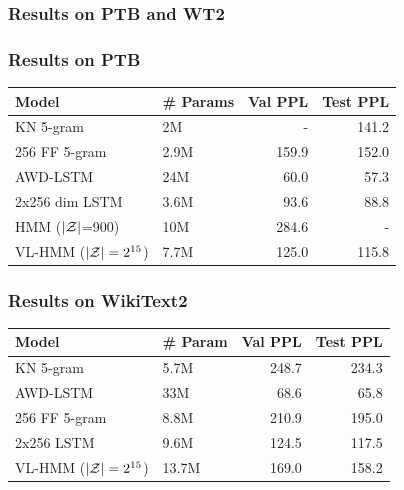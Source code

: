 \documentclass{beamer}
\begin{document}
\begin{frame}
\frametitle{Results on PTB and WT2}
\centering
{}
\end{frame}

\begin{frame}
\frametitle{Results on PTB}

\begin{table}[!t]
\centering
\begin{tabular}{llrr}
\toprule
Model & \# Params & Val PPL  & Test PPL\\
\midrule
KN 5-gram   & 2M & - & 141.2\\
256 FF 5-gram  & 2.9M     & 159.9      & 152.0  \\
AWD-LSTM  & 24M & 60.0 & 57.3\\
2x256 dim LSTM  & 3.6M     & 93.6       & 88.8   \\
HMM ($|\mathcal{Z}|$=900) & 10M & 284.6 & -\\
VL-HMM ($|\mathcal{Z}|=2^{15}$)   & 7.7M     & 125.0      & 115.8  \\
\bottomrule
\end{tabular}
\end{table}

\end{frame}

\begin{frame}
\frametitle{Results on WikiText2}

\begin{table}[!t]
\centering
\begin{tabular}{llrr}
\toprule
Model & \# Param & Val PPL & Test PPL\\
\midrule
KN 5-gram & 5.7M       & 248.7 & 234.3\\
AWD-LSTM & 33M & 68.6 & 65.8\\
256 FF 5-gram        & 8.8M    & 210.9  & 195.0\\
2x256  LSTM     & 9.6M    & 124.5  & 117.5\\
VL-HMM ($|\mathcal{Z}|=2^{15}$)           & 13.7M   & 169.0      & 158.2\\
\bottomrule
\end{tabular}
\end{table}

\end{frame}
\end{document}
